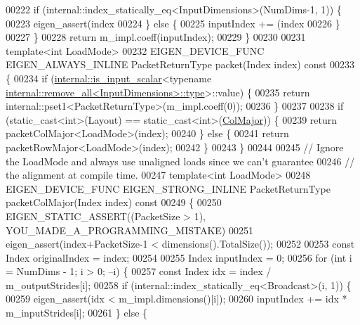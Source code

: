 \begin{DoxyCode}
00222       \textcolor{keywordflow}{if} (internal::index\_statically\_eq<InputDimensions>(NumDims-1, 1)) \{
00223         eigen\_assert(index %
00224       \} \textcolor{keywordflow}{else} \{
00225         inputIndex += (index %
00226       \}
00227     \}
00228     \textcolor{keywordflow}{return} m\_impl.coeff(inputIndex);
00229   \}
00230 
00231   \textcolor{keyword}{template}<\textcolor{keywordtype}{int} LoadMode>
00232   EIGEN\_DEVICE\_FUNC EIGEN\_ALWAYS\_INLINE PacketReturnType packet(Index index)\textcolor{keyword}{ const}
00233 \textcolor{keyword}{  }\{
00234     \textcolor{keywordflow}{if} (\hyperlink{struct_eigen_1_1internal_1_1is__input__scalar}{internal::is\_input\_scalar}<\textcolor{keyword}{typename} 
      \hyperlink{group___sparse_core___module}{internal::remove\_all<InputDimensions>::type}>::value) \{
00235       \textcolor{keywordflow}{return} internal::pset1<PacketReturnType>(m\_impl.coeff(0));
00236     \}
00237 
00238     \textcolor{keywordflow}{if} (static\_cast<int>(Layout) == \textcolor{keyword}{static\_cast<}\textcolor{keywordtype}{int}\textcolor{keyword}{>}(\hyperlink{group__enums_ggaacded1a18ae58b0f554751f6cdf9eb13a0cbd4bdd0abcfc0224c5fcb5e4f6669a}{ColMajor})) \{
00239       \textcolor{keywordflow}{return} packetColMajor<LoadMode>(index);
00240     \} \textcolor{keywordflow}{else} \{
00241       \textcolor{keywordflow}{return} packetRowMajor<LoadMode>(index);
00242     \}
00243   \}
00244 
00245   \textcolor{comment}{// Ignore the LoadMode and always use unaligned loads since we can't guarantee}
00246   \textcolor{comment}{// the alignment at compile time.}
00247   \textcolor{keyword}{template}<\textcolor{keywordtype}{int} LoadMode>
00248   EIGEN\_DEVICE\_FUNC EIGEN\_STRONG\_INLINE PacketReturnType packetColMajor(Index index)\textcolor{keyword}{ const}
00249 \textcolor{keyword}{  }\{
00250     EIGEN\_STATIC\_ASSERT((PacketSize > 1), YOU\_MADE\_A\_PROGRAMMING\_MISTAKE)
00251     eigen\_assert(index+PacketSize-1 < dimensions().TotalSize());
00252 
00253     \textcolor{keyword}{const} Index originalIndex = index;
00254 
00255     Index inputIndex = 0;
00256     \textcolor{keywordflow}{for} (\textcolor{keywordtype}{int} i = NumDims - 1; i > 0; --i) \{
00257       \textcolor{keyword}{const} Index idx = index / m\_outputStrides[i];
00258       \textcolor{keywordflow}{if} (internal::index\_statically\_eq<Broadcast>(i, 1)) \{
00259         eigen\_assert(idx < m\_impl.dimensions()[i]);
00260         inputIndex += idx * m\_inputStrides[i];
00261       \} \textcolor{keywordflow}{else} \{

\end{DoxyCode}
